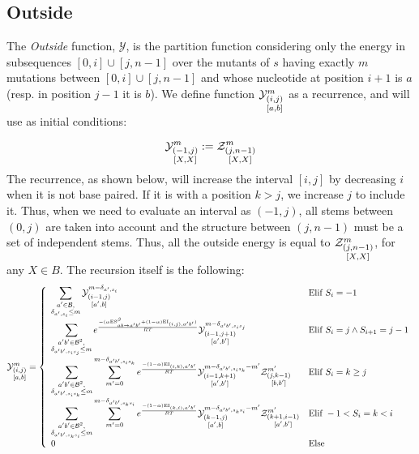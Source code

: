 \subsection{Outside}	
The \emph{Outside} function, $\mathcal Y$, is the partition function considering only the 
energy in subsequences $[0,i]\cup[j,n-1]$ over the mutants of $s$ having exactly $m$ mutations between $[0,i]\cup[j,n-1]$ and whose nucleotide at position $i+1$ is $a$ 
(resp. in position $j-1$ it is $b$).
We define function $\Y{i,j}{m}{a,b}$ as a recurrence, and will use as initial conditions:

$$
	\Y{-1,j}{m}{X,X}:=
		\displaystyle
	  \Z{j,n-1}{m}{X,X}
$$
The recurrence, as shown below, will increase the interval $[i,j]$ by decreasing $i$ when
it is not base paired. If it is with a position $k>j$, we increase $j$ to include it.
 Thus, when we need
to evaluate an interval as $(-1,j)$, all stems between $(0,j)$ are taken into account and the
structure between $(j,n-1)$ must be a set of independent stems. Thus, all the outside energy is
equal to $\Z{j,n-1}{m}{X,X}$, for any $X\in B$. The recursion itself is the following:
$$
	\Y{i,j}{m}{a,b} = \left\{
  \begin{array}{ll}
		\displaystyle
    \sum_{\substack{a'\in \B,\\ \Kron_{a',s_i}\le m}}
    \Y{i-1,j}{m- \Kron_{a',s_i}}{a',b} &
    \text{Elif }S_i=-1 \\
    \displaystyle
    \sum_{\substack{a'b'\in \B^2,\\ \Kron_{a'b',s_is_j}\le m}}
		 e^{\frac{-(\alpha \text{ES}^\beta_{a b \to a' b'}+(1-\alpha)\text{EI}_{(i,j),a'b'})}{RT}}
    \Y{i-1,j+1}{m- \Kron_{a'b',s_is_j}}{a',b'} &
   	 \text{Elif }S_{i}=j \land S_{i+1}=j-1\\
		 \displaystyle
		 \sum_{\substack{a'b'\in \B^2,\\ \Kron_{a'b',s_is_k}\le m}}
		 \sum_{m'=0}^{m-\Kron_{a'b',s_is_k}}
  		 e^{\frac{-(1-\alpha)\text{EI}_{(i,k),a'b'}}{RT}}
		 \Y{i-1,k+1}{m- \Kron_{a'b',s_is_k} - m'}{a',b'}
     \Z{j,k-1}{m'}{b,b'} &
		 \text{Elif }S_{i}=k \geq j\\
		 \displaystyle
		 \sum_{\substack{a'b'\in \B^2,\\ \Kron_{a'b',s_ks_i}\le m}}
		 \sum_{m'=0}^{m-\Kron_{a'b',s_ks_i}}
   	 e^{\frac{-(1-\alpha)\text{EI}_{(k,i),a'b'}}{RT}}
		 \Y{k-1,j}{m- \Kron_{a'b',s_ks_i} - m'}{a',b}
     \Z{k+1,i-1}{m'}{a',b'} &
		 \text{Elif }-1 < S_{i}=k < i\\
		 0 & \text{Else}
  \end{array}\right.
$$
